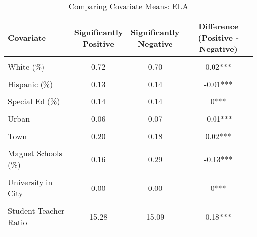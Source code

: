 \begin{table}[!h]
\centering
\caption{\label{tab:cov_means_ela_all}Comparing Covariate Means: ELA}
\centering
\begin{tabular}[t]{lccc}
\toprule
Covariate & \makecell[c]{Significantly\\Positive} & \makecell[c]{Significantly\\Negative} & \makecell[c]{Difference\\(Positive - Negative)}\\
\midrule
\cellcolor{gray!10}{Log of Enrollment} & \cellcolor{gray!10}{7.47} & \cellcolor{gray!10}{7.48} & \cellcolor{gray!10}{-0.01**}\\
White (\%) & 0.72 & 0.70 & 0.02***\\
\cellcolor{gray!10}{Black (\%)} & \cellcolor{gray!10}{0.08} & \cellcolor{gray!10}{0.08} & \cellcolor{gray!10}{0***}\\
Hispanic (\%) & 0.13 & 0.14 & -0.01***\\
\cellcolor{gray!10}{Free/Reduced Lunch (\%)} & \cellcolor{gray!10}{0.48} & \cellcolor{gray!10}{0.48} & \cellcolor{gray!10}{0**}\\
Special Ed (\%) & 0.14 & 0.14 & 0***\\
\cellcolor{gray!10}{Baseline Performance} & \cellcolor{gray!10}{0.12} & \cellcolor{gray!10}{0.12} & \cellcolor{gray!10}{0}\\
Urban & 0.06 & 0.07 & -0.01***\\
\cellcolor{gray!10}{Suburb} & \cellcolor{gray!10}{0.27} & \cellcolor{gray!10}{0.29} & \cellcolor{gray!10}{-0.02***}\\
Town & 0.20 & 0.18 & 0.02***\\
\cellcolor{gray!10}{Rural} & \cellcolor{gray!10}{0.48} & \cellcolor{gray!10}{0.47} & \cellcolor{gray!10}{0.01***}\\
Magnet Schools (\%) & 0.16 & 0.29 & -0.13***\\
\cellcolor{gray!10}{City Population (standardized)} & \cellcolor{gray!10}{0.00} & \cellcolor{gray!10}{0.00} & \cellcolor{gray!10}{0***}\\
University in City & 0.00 & 0.00 & 0***\\
\cellcolor{gray!10}{Per Pupil Revenue} & \cellcolor{gray!10}{13096.46} & \cellcolor{gray!10}{13600.83} & \cellcolor{gray!10}{-504.36***}\\
Student-Teacher Ratio & 15.28 & 15.09 & 0.18***\\
\cellcolor{gray!10}{Teacher Salary} & \cellcolor{gray!10}{93318.71} & \cellcolor{gray!10}{95645.00} & \cellcolor{gray!10}{-2326.29***}\\

\end{tabular}
\end{table}
